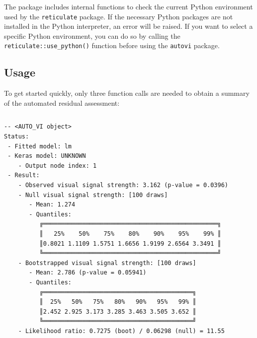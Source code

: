 \documentclass[
doublespace,
  times]{anzsauth}
\newenvironment{Shaded}{\begin{snugshade}}{\end{snugshade}}
\newcommand{\AttributeTok}[1]{\textcolor[rgb]{0.40,0.45,0.13}{#1}}
\newcommand{\FunctionTok}[1]{\textcolor[rgb]{0.28,0.35,0.67}{#1}}
\newcommand{\NormalTok}[1]{\textcolor[rgb]{0.00,0.23,0.31}{#1}}
\newcommand{\OtherTok}[1]{\textcolor[rgb]{0.00,0.23,0.31}{#1}}
\newcommand{\SpecialCharTok}[1]{\textcolor[rgb]{0.37,0.37,0.37}{#1}}
\begin{document}
The package includes internal functions to check the current Python
environment used by the \texttt{reticulate} package. If the necessary
Python packages are not installed in the Python interpreter, an error
will be raised. If you want to select a specific Python environment, you
can do so by calling the \texttt{reticulate::use\_python()} function
before using the \texttt{autovi} package.

\subsection{Usage}\label{sec-autovi-usage}

To get started quickly, only three function calls are needed to obtain a
summary of the automated residual assessment:

\begin{Shaded}
\end{Shaded}

\begin{verbatim}
\end{verbatim}

\begin{verbatim}
-- <AUTO_VI object>
Status:
 - Fitted model: lm
 - Keras model: UNKNOWN
    - Output node index: 1
 - Result:
    - Observed visual signal strength: 3.162 (p-value = 0.0396)
    - Null visual signal strength: [100 draws]
       - Mean: 1.274
       - Quantiles: 
          ╔═════════════════════════════════════════════════╗
          ║   25%    50%    75%    80%    90%    95%    99% ║
          ║0.8021 1.1109 1.5751 1.6656 1.9199 2.6564 3.3491 ║
          ╚═════════════════════════════════════════════════╝
    - Bootstrapped visual signal strength: [100 draws]
       - Mean: 2.786 (p-value = 0.05941)
       - Quantiles: 
          ╔══════════════════════════════════════════╗
          ║  25%   50%   75%   80%   90%   95%   99% ║
          ║2.452 2.925 3.173 3.285 3.463 3.505 3.652 ║
          ╚══════════════════════════════════════════╝
    - Likelihood ratio: 0.7275 (boot) / 0.06298 (null) = 11.55 
\end{verbatim}
\end{document}
